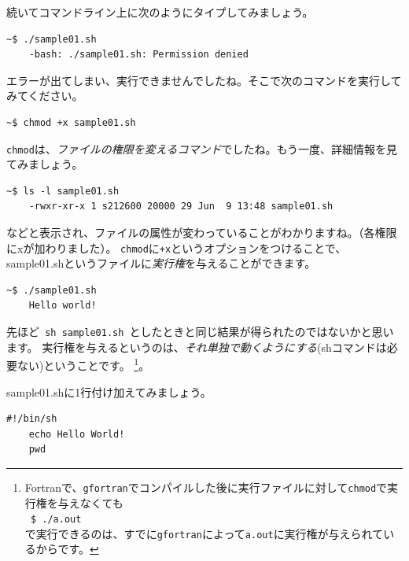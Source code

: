 \documentclass[a4j]{ltjreport}
\begin{document}
    続いてコマンドライン上に次のようにタイプしてみましょう。
    \begin{lstlisting}[numbers=none]
    ~$ ./sample01.sh
    -bash: ./sample01.sh: Permission denied
    \end{lstlisting}

    エラーが出てしまい、実行できませんでしたね。そこで次のコマンドを実行してみてください。
    \begin{lstlisting}[numbers=none]
    ~$ chmod +x sample01.sh
    \end{lstlisting}

    \texttt{chmod}は、\emph{ファイルの権限を変えるコマンド}でしたね。もう一度、詳細情報を見てみましょう。
    \begin{lstlisting}[numbers=none]
    ~$ ls -l sample01.sh
    -rwxr-xr-x 1 s212600 20000 29 Jun  9 13:48 sample01.sh
    \end{lstlisting}
    などと表示され、ファイルの属性が変わっていることがわかりますね。（各権限にxが加わりました）。
    \texttt{chmod}に\texttt{+x}というオプションをつけることで、
    sample01.shというファイルに\emph{実行権}を与えることができます。
    \begin{lstlisting}[numbers=none]
    ~$ ./sample01.sh
    Hello world!
    \end{lstlisting}
    先ほど\verb| sh sample01.sh |としたときと同じ結果が得られたのではないかと思います。
    実行権を与えるというのは、\emph{それ単独で動くようにする}(shコマンドは必要ない)ということです。
    \footnote{Fortranで、\texttt{gfortran}でコンパイルした後に実行ファイルに対して\texttt{chmod}で実行権を与えなくても
    \\
        \texttt{~\$ ./a.out}
    \\
    で実行できるのは、すでに\texttt{gfortran}によって\texttt{a.out}に実行権が与えられているからです。}。

    sample01.shに1行付け加えてみましょう。
    \begin{lstlisting}[caption=sample01.sh改]
    #!/bin/sh
    echo Hello World!
    pwd
    \end{lstlisting}
\end{document}
